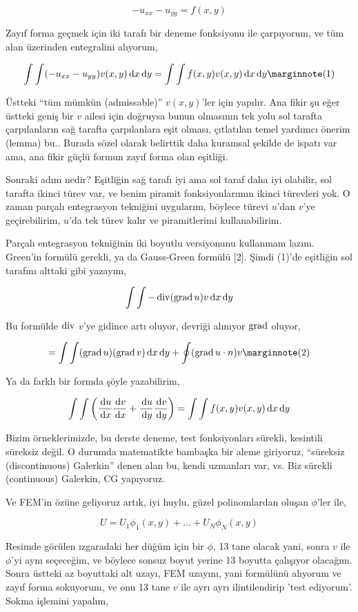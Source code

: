 \documentclass[12pt,fleqn]{article}\usepackage{../../common}
\begin{document}
$$
-u_{xx} - u_{yy} = f(x,y)
$$

Zayıf forma geçmek için iki tarafı bir deneme fonksiyonu ile çarpıyorum,
ve tüm alan üzerinden entegralini alıyorum,

$$
\int \int (-u_{xx} - u_{yy}) v(x,y) \ud x \ud y =
\int \int f(x,y) v(x,y)  \ud x \ud y
\mlabel{1}
$$

Üstteki ``tüm mümkün (admissable)'' $v(x,y)$'ler için yapılır. Ana fikir şu eğer
üstteki geniş bir $v$ ailesi için doğruysa bunun olmasının tek yolu sol tarafta
çarpılanların sağ tarafta çarpılanlara eşit olması, çıtlatılan temel yardımcı
önerim (lemma) bu.. Burada sözel olarak belirttik daha kuramsal şekilde de
ispatı var ama, ana fikir güçlü formun zayıf forma olan eşitliği.

Sonraki adım nedir? Eşitliğin sağ tarafı iyi ama sol taraf daha iyi olabilir,
sol tarafta ikinci türev var, ve benim piramit fonksiyonlarımın ikinci türevleri
yok. O zaman parçalı entegrasyon tekniğini uygularım, böylece türevi $u$'dan
$v$'ye geçirebilirim, $u$'da tek türev kalır ve piramitlerimi kullanabilirim.

Parçalı entegrasyon tekniğinin iki boyutlu versiyonunu kullanmam lazım. Green'in
formülü gerekli, ya da Gauss-Green formülü [2]. Şimdi (1)'de eşitliğin
sol tarafını alttaki gibi yazayım,

$$
\int \int -\operatorname{div} (\operatorname{grad} u) v \,\mathrm{d} x \,\mathrm{d} y
$$

Bu formülde  $\operatorname{div}$ $v$'ye gidince artı oluyor, devriği alınıyor $\operatorname{grad}$
oluyor, 

$$
= \int \int (\grad u) (\grad v) \ud x \ud y  + \oint (\grad u \cdot n) v
\mlabel{2}
$$

Ya da farklı bir formda şöyle yazabilirim, 

$$
\int \int
\left(
\frac{\,\mathrm{d} u}{\,\mathrm{d} x} \frac{\,\mathrm{d} v}{\,\mathrm{d} x} +
\frac{\,\mathrm{d} u}{\,\mathrm{d} y} \frac{\,\mathrm{d} v}{\,\mathrm{d} y} 
\right) =
\int \int f(x,y) v(x,y)  \,\mathrm{d} x \,\mathrm{d} y
$$

Bizim örneklerimizde, bu derste deneme, test fonksiyonları sürekli, kesintili
süreksiz değil. O durumda matematikte bambaşka bir aleme giriyoruz, ``süreksiz
(discontinuous) Galerkin'' denen alan bu, kendi uzmanları var, vs. Biz sürekli
(continuous) Galerkin, CG yapıyoruz.

Ve FEM'in özüne geliyoruz artık, iyi huylu, güzel polinomlardan oluşan
$\phi$'ler ile,

$$
U = U_1 \phi_1 (x,y) + ... + U_N \phi_N (x,y) 
$$

Resimde görülen ızgaradaki her düğüm için bir $\phi$, 13 tane olacak yani, sonra
$v$ ile $\phi$'yi aynı seçeceğim, ve böylece sonsuz boyut yerine 13 boyutta
çalışıyor olacağım. Sonra üstteki az boyuttaki alt uzayı, FEM uzayını, yani
formülünü alıyorum ve zayıf forma sokuyorum, ve onu 13 tane $v$ ile ayrı ayrı
ilintilendirip 'test ediyorum'. Sokma işlemini yapalım,
\end{document}
